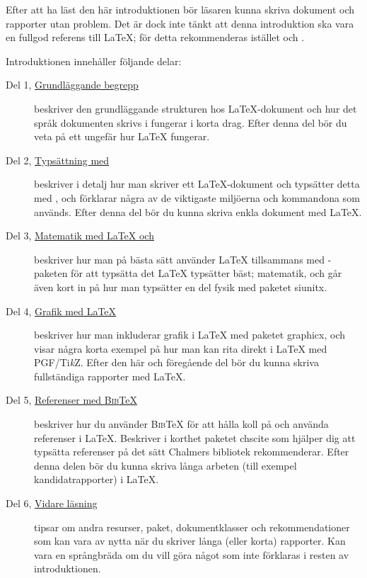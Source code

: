 \documentclass[swe,12pt]{skrapport}
\newcommand\pack[1]{\textsf{#1}}						%
\newcommand\pdfLaTeX{\hologo{pdfLaTeX}}					%
\newcommand\BibTeX{\textsc{Bib}\TeX}					%
\newcommand\PGFTikZ{PGF/Ti\emph{k}Z}					%
\begin{document}
	Efter att ha läst den här introduktionen bör läsaren kunna skriva
	dokument och rapporter utan problem. Det är dock inte tänkt att denna
	introduktion ska vara en fullgod referens till \LaTeX; för detta
	rekommenderas istället  och
	.
	
	Introduktionen innehåller följande delar:
	\begin{description}
		\item[{Del 1, \hyperref[sec:1]{Grundläggande begrepp}}]
		beskriver den grundläggande strukturen hos \LaTeX-dokument och hur det
		språk dokumenten skrivs i fungerar i korta drag. Efter denna del bör
		du veta på ett ungefär hur \LaTeX{} fungerar.
		
		\item[{Del 2, \hyperref[sec:2]{Typsättning med \pdfLaTeX}}]
		beskriver i detalj hur man skriver ett \LaTeX-dokument och typsätter
		detta med \pdfLaTeX, och förklarar några av de viktigaste miljöerna
		och kommandona som används. Efter denna del bör du kunna skriva enkla
		dokument med \LaTeX.
		
		\item[{Del 3, \hyperref[sec:3]{Matematik med \LaTeX{} och \AmS}}]
		beskriver hur man på bästa sätt använder \LaTeX{} tillsammans med
		\AmS-paketen för att typsätta det \LaTeX{} typsätter bäst; matematik,
		och går även kort in på hur man typsätter en del fysik med paketet
		\pack{siunitx}.
		
		\item[{Del 4, \hyperref[sec:4]{Grafik med \LaTeX}}]
		beskriver hur man inkluderar grafik i \LaTeX{} med paketet
		\pack{graphicx}, och visar några korta exempel på hur man kan rita
		direkt i \LaTeX{} med \PGFTikZ{}. Efter den här och föregående del bör
		du kunna skriva fullständiga rapporter med \LaTeX.
		
		\item[{Del 5, \hyperref[sec:5]{Referenser med \BibTeX}}]
		beskriver hur du använder \BibTeX{} för att hålla koll på och använda
		referenser i \LaTeX. Beskriver i korthet paketet \pack{chscite} som
		hjälper dig att typsätta referenser på det sätt Chalmers bibliotek
		rekommenderar. Efter denna delen bör du kunna skriva långa arbeten
		(till exempel kandidatrapporter) i \LaTeX.
		
		\item[{Del 6, \hyperref[sec:6]{Vidare läsning}}]
		tipsar om andra resurser, paket, dokumentklasser och rekommendationer
		som kan vara av nytta när du skriver långa (eller korta) rapporter.
		Kan vara en språngbräda om du vill göra något som inte förklaras i
		resten av introduktionen.
	\end{description}
	
\end{document}
